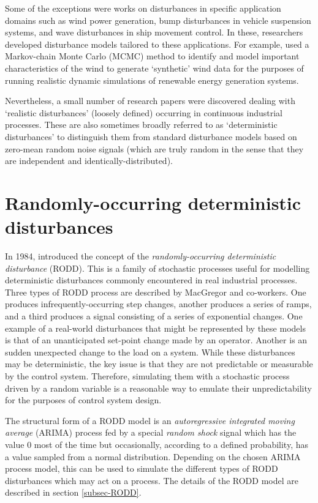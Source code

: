 Some of the exceptions were works on disturbances in specific application domains such as wind power generation, bump disturbances in vehicle suspension systems, and wave disturbances in ship movement control.  In these, researchers developed disturbance models tailored to these applications. For example, \cite{papaefthymiou_mcmc_2008} used a Markov-chain Monte Carlo (MCMC) method to identify and model important characteristics of the wind to generate `synthetic' wind data for the purposes of running realistic dynamic simulations of renewable energy generation systems.

Nevertheless, a small number of research papers were discovered dealing with `realistic disturbances' (loosely defined) occurring in continuous industrial processes. These are also sometimes broadly referred to as `deterministic disturbances' to distinguish them from standard disturbance models based on zero-mean random noise signals (which are truly random in the sense that they are independent and identically-distributed).

\section*{Randomly-occurring deterministic disturbances} \label{RODDs}

In 1984, \cite{macgregor_duality_1984} introduced the concept of the \textit{randomly-occurring deterministic disturbance} (RODD). This is a family of stochastic processes useful for modelling deterministic disturbances commonly encountered in real industrial processes. Three types of RODD process are described by MacGregor and co-workers. One produces infrequently-occurring step changes, another produces a series of ramps, and a third produces a signal consisting of a series of exponential changes. One example of a real-world disturbances that might be represented by these models is that of an unanticipated set-point change made by an operator. Another is an sudden unexpected change to the load on a system. While these disturbances may be deterministic, the key issue is that they are not predictable or measurable by the control system. Therefore, simulating them with a stochastic process driven by a random variable is a reasonable way to emulate their unpredictability for the purposes of control system design.

The structural form of a RODD model is an \textit{autoregressive integrated moving average} (ARIMA) process fed by a special \textit{random shock} signal which has the value 0 most of the time but occasionally, according to a defined probability, has a value sampled from a normal distribution. Depending on the chosen ARIMA process model, this can be used to simulate the different types of RODD disturbances which may act on a process. The details of the RODD model are described in section \ref{subsec-RODD}.

